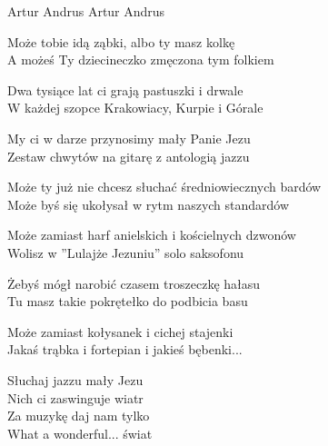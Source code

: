 {Artur Andrus}
{Artur Andrus}
\begin{text}
Może tobie idą ząbki, albo ty masz kolkę\\
A możeś Ty dziecineczko zmęczona tym folkiem

Dwa tysiące lat ci grają pastuszki i drwale\\
W każdej szopce Krakowiacy, Kurpie i Górale

My ci w darze przynosimy mały Panie Jezu\\
Zestaw chwytów na gitarę z antologią jazzu

Może ty już nie chcesz słuchać średniowiecznych bardów\\
Może byś się ukołysał w rytm naszych standardów

Może zamiast harf anielskich i kościelnych dzwonów\\
Wolisz w ”Lulajże Jezuniu” solo saksofonu

Żebyś mógł narobić czasem troszeczkę hałasu\\
Tu masz takie pokrętełko do podbicia basu

Może zamiast kołysanek i cichej stajenki\\
Jakaś trąbka i fortepian i jakieś bębenki...

Słuchaj jazzu mały Jezu\\
Nich ci zaswinguje wiatr\\
Za muzykę daj nam tylko \\
What a wonderful... świat
\end{text}
\begin{chord}
\end{chord}
